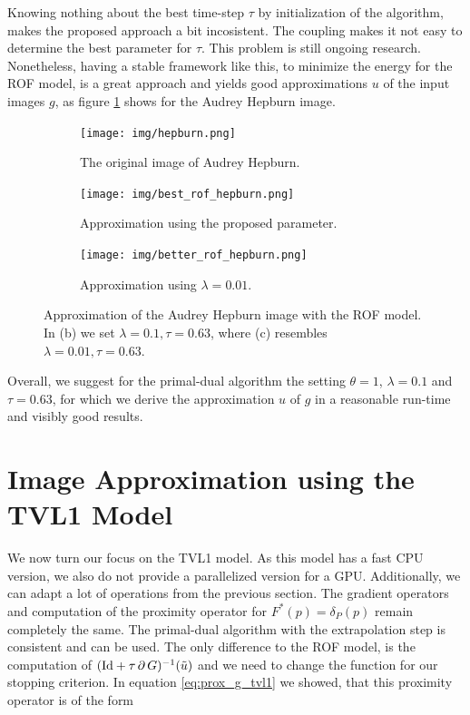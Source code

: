 \documentclass{scrreprt}
\begin{document}
            Knowing nothing about the best time-step $\tau$ by initialization of the algorithm, makes the proposed approach a bit incosistent. The coupling makes it not easy to determine the best parameter for $\tau$. This problem is still ongoing research. Nonetheless, having a stable framework like this, to minimize the energy for the ROF model, is a great approach and yields good approximations $u$ of the input images $g$, as figure \ref{fig:best_rof_hepburn} shows for the Audrey Hepburn image.

            \begin{figure}[!ht]
                \centering
                \begin{subfigure}[b]{0.32\textwidth}
                    \texttt{[image: img/hepburn.png]}
                    \caption{The original image of Audrey Hepburn.}
                \end{subfigure}
                \begin{subfigure}[b]{0.32\textwidth}
                    \texttt{[image: img/best\_rof\_hepburn.png]}
                    \caption{Approximation using the proposed parameter.}
                \end{subfigure}
                \begin{subfigure}[b]{0.32\textwidth}
                    \texttt{[image: img/better\_rof\_hepburn.png]}
                    \caption{Approximation using $\lambda = 0.01$.}
                \end{subfigure}
                \caption[Best approximation using the ROF model with Hepburn image.]{Approximation of the Audrey Hepburn image with the ROF model. In (b) we set $\lambda = 0.1, \tau = 0.63$, where (c) resembles $\lambda = 0.01, \tau = 0.63$.}
                \label{fig:best_rof_hepburn}
            \end{figure}

            Overall, we suggest for the primal-dual algorithm the setting $\theta = 1$, $\lambda = 0.1$ and $\tau = 0.63$, for which we derive the approximation $u$ of $g$ in a reasonable run-time and visibly good results.

    \section{Image Approximation using the TVL1 Model} %
    \label{sec:image_approximation_using_the_tvl1_model}

        We now turn our focus on the TVL1 model. As this model has a fast CPU version, we also do not provide a parallelized version for a GPU. Additionally, we can adapt a lot of operations from the previous section. The gradient operators and computation of the proximity operator for $F^{\ast}(p) = \delta_{P}(p)$ remain completely the same. The primal-dual algorithm with the extrapolation step is consistent and can be used. The only difference to the ROF model, is the computation of $(\textnormal{Id} + \tau\,\partial\,G)^{-1}(\tilde{u})$ and we need to change the function for our stopping criterion. In equation \ref{eq:prox_g_tvl1} we showed, that this proximity operator is of the form
\end{document}

